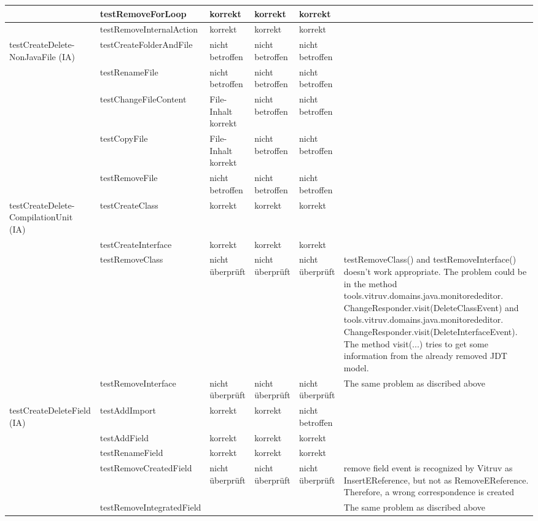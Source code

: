 \begin{tiny}
\begin{longtable}[c]{|p{2.2cm}|p{3.5cm}|p{1cm}|p{1cm}|p{1cm}|p{4cm}|}
 & testRemoveForLoop & korrekt & korrekt & korrekt &  \\ \hline
 & testRemoveInternalAction & korrekt & korrekt & korrekt &  \\ \hline
testCreateDelete- NonJavaFile 			(IA) & testCreateFolderAndFile & nicht 			betroffen & nicht 			betroffen & nicht 			betroffen &  \\ \hline
 & testRenameFile & nicht 			betroffen & nicht 			betroffen & nicht 			betroffen &  \\ \hline
 & testChangeFileContent & File-Inhalt 			korrekt & nicht 			betroffen & nicht 			betroffen &  \\ \hline
 & testCopyFile & File-Inhalt 			korrekt & nicht 			betroffen & nicht 			betroffen &  \\ \hline
 & testRemoveFile & nicht 			betroffen & nicht 			betroffen & nicht 			betroffen &  \\ \hline
testCreateDelete- CompilationUnit 			(IA) & testCreateClass & korrekt & korrekt & korrekt &  \\ \hline
 & testCreateInterface & korrekt & korrekt & korrekt &  \\ \hline
 & testRemoveClass & nicht 			überprüft & nicht 			überprüft & nicht 			überprüft & testRemoveClass() and testRemoveInterface() doesn't work appropriate. The problem could be in the method tools.vitruv.domains.java.monitorededitor. ChangeResponder.visit(DeleteClassEvent) and tools.vitruv.domains.java.monitorededitor. ChangeResponder.visit(DeleteInterfaceEvent). The method visit(...) tries to get some information from the already removed JDT model. \\ \hline
 & testRemoveInterface & nicht 			überprüft & nicht 			überprüft & nicht 			überprüft & The 			same problem as discribed above \\ \hline
testCreateDeleteField 			(IA) & testAddImport & korrekt & korrekt & nicht 			betroffen &  \\ \hline
 & testAddField & korrekt & korrekt & korrekt &  \\ \hline
 & testRenameField & korrekt & korrekt & korrekt &  \\ \hline
 & testRemoveCreatedField & nicht 			überprüft & nicht 			überprüft & nicht 			überprüft & remove field event is recognized by Vitruv as InsertEReference, but not as RemoveEReference. Therefore, a wrong correspondence is created \\ \hline
 & testRemoveIntegratedField &  &  &  & The same problem as discribed above \\ \hline

\end{longtable}
\end{tiny}
